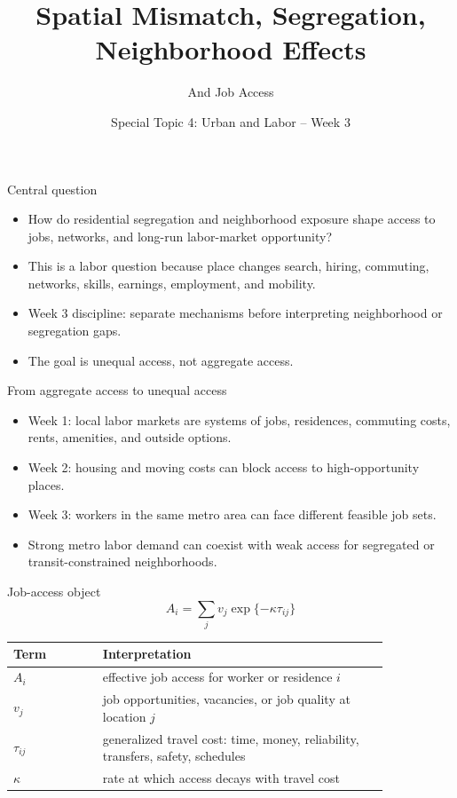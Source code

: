 \documentclass[aspectratio=169,11pt]{beamer}
\title{Spatial Mismatch, Segregation, Neighborhood Effects}
\subtitle{And Job Access}
\author{Special Topic 4: Urban and Labor -- Week 3}
\date{}
\begin{document}
\begin{frame}
  \titlepage
\end{frame}

\begin{frame}{Central question}
\begin{itemize}
    \item How do residential segregation and neighborhood exposure shape access to jobs, networks, and long-run labor-market opportunity?
    \item This is a labor question because place changes search, hiring, commuting, networks, skills, earnings, employment, and mobility.
    \item Week 3 discipline: separate mechanisms before interpreting neighborhood or segregation gaps.
    \item The goal is unequal access, not aggregate access.
\end{itemize}
\end{frame}

\begin{frame}{From aggregate access to unequal access}
\begin{itemize}
    \item Week 1: local labor markets are systems of jobs, residences, commuting costs, rents, amenities, and outside options.
    \item Week 2: housing and moving costs can block access to high-opportunity places.
    \item Week 3: workers in the same metro area can face different feasible job sets.
    \item Strong metro labor demand can coexist with weak access for segregated or transit-constrained neighborhoods.
\end{itemize}
\end{frame}

\begin{frame}{Job-access object}
\[
A_i = \sum_j v_j \exp\{-\kappa \tau_{ij}\}
\]
\small
\begin{tabular}{p{0.20\linewidth} p{0.64\linewidth}}
\toprule
Term & Interpretation \\
\midrule
$A_i$ & effective job access for worker or residence $i$ \\
$v_j$ & job opportunities, vacancies, or job quality at location $j$ \\
$\tau_{ij}$ & generalized travel cost: time, money, reliability, transfers, safety, schedules \\
$\kappa$ & rate at which access decays with travel cost \\
\bottomrule
\end{tabular}
\end{frame}
\end{document}
